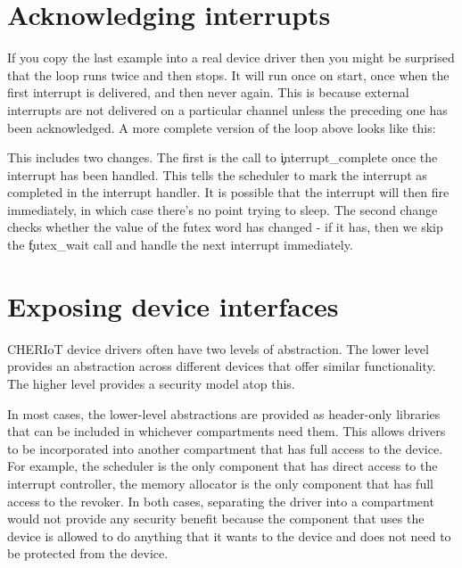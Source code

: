 \section{Acknowledging interrupts}

If you copy the last example into a real device driver then you might be surprised that the loop runs twice and then stops.
It will run once on start, once when the first interrupt is delivered, and then never again.
This is because external interrupts are not delivered on a particular channel unless the preceding one has been acknowledged.
A more complete version of the loop above looks like this:

\begin{cxxsnippet}
do
{
    uint32_t last = *ethernetFutex;
    // Handle interrupt here
    interrupt_complete(STATIC_SEALED_VALUE(ethernetInterruptCapability));
\} while ((last != *ethernetFutex) || futex_wait(ethernetFutex, last) == 0);
\end{cxxsnippet}

This includes two changes.
The first is the call to \c{interrupt_complete} once the interrupt has been handled.
This tells the scheduler to mark the interrupt as completed in the interrupt handler.
It is possible that the interrupt will then fire immediately, in which case there's no point trying to sleep.
The second change checks whether the value of the futex word has changed - if it has, then we skip the \c{futex_wait} call and handle the next interrupt immediately.

\section{Exposing device interfaces}

CHERIoT device drivers often have two levels of abstraction.
The lower level provides an abstraction across different devices that offer similar functionality.
The higher level provides a security model atop this.

In most cases, the lower-level abstractions are provided as header-only libraries that can be included in whichever compartments need them.
This allows drivers to be incorporated into another compartment that has full access to the device.
For example, the scheduler is the only component that has direct access to the interrupt controller, the memory allocator is the only component that has full access to the revoker.
In both cases, separating the driver into a compartment would not provide any security benefit because the component that uses the device is allowed to do anything that it wants to the device and does not need to be protected from the device.

